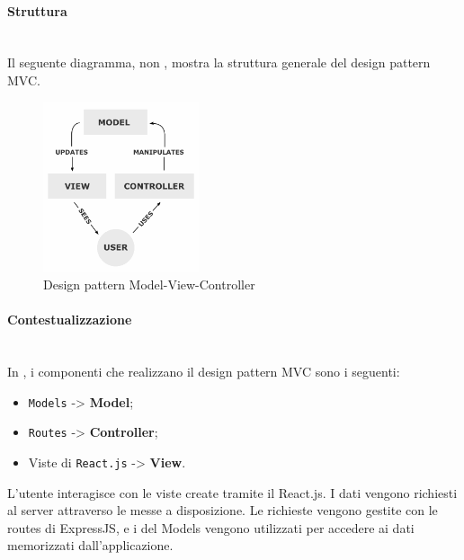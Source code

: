 \paragraph{Struttura} \mbox{} \\
Il seguente diagramma, non , mostra la struttura generale del design pattern MVC.
\begin{figure}[H]
\centering
\includegraphics[height=5cm]{res/sections/backend/mvc.png}
\caption{Design pattern Model-View-Controller}
\end{figure}
\paragraph{Contestualizzazione} \mbox{} \\
In , i componenti che realizzano il design pattern MVC sono i seguenti:
\begin{itemize}
\item {} \texttt{Models} -> \textbf{Model};
\item {} \texttt{Routes} -> \textbf{Controller};
\item Viste di \texttt{React.js} -> \textbf{View}.
\end{itemize}
L'utente interagisce con le viste create tramite il  React.js. I dati vengono richiesti al server attraverso le   messe a disposizione. Le richieste vengono gestite con le routes di ExpressJS, e i  del  Models vengono utilizzati per accedere ai dati memorizzati dall'applicazione.
